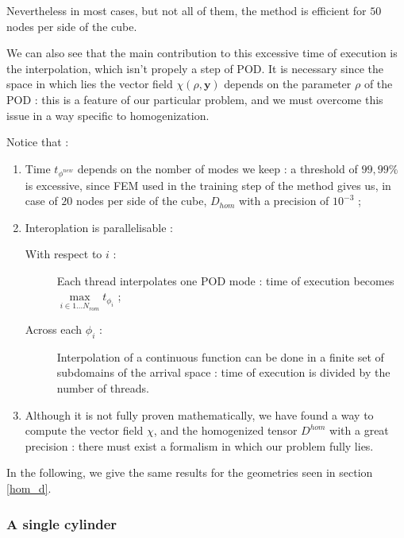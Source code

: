 {\begin{minipage}{\linewidth}
\par
Nevertheless in most cases, but not all of them, the method is efficient for $50$ nodes per side of the cube.

\par
We can also see that the main contribution to this excessive time of execution is the interpolation, which isn't propely a step of POD. %
It is necessary since the space in which lies the vector field $\chi(\rho,\mathbf{y})$ depends on the parameter $\rho$ of the POD : %
this is a feature of our particular problem, and we must overcome this issue in a way specific to homogenization.

\par
Notice that :

\begin{enumerate}[label=(interp \roman*)]
\item Time $t_{\phi^{new}}$ depends on the nomber of modes we keep : %
a threshold of $99,99\%$ is excessive, since FEM used in the training step of the method gives us, %
in case of $20$ nodes per side of the cube, $D_{hom}$ with a precision of $10^{-3}$ ;
%
\item Interoplation is parallelisable :
\begin{description}
\item [With respect to $i$ :] Each thread interpolates one POD mode : time of execution becomes $\max\limits_{i\in 1\dots N_{rom}}t_{\phi_i}$ ;
\item [Across each $\phi_i$ :] Interpolation of a continuous function can be done in a finite set of subdomains of the arrival space : %
time of execution is divided by the number of threads.
\end{description}
\item Although it is not fully proven mathematically, we have found a way to compute the vector field $\chi$, and the homogenized tensor $D^{hom}$ with a great precision : %
there must exist a formalism in which our problem fully lies.
\end{enumerate}
\end{minipage}


In the following, we give the same results for the geometries seen in section \ref{hom_d}.

\subsubsection{A single cylinder}

}
